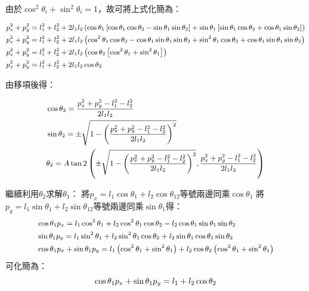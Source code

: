 \documentclass[class=NCU_thesis, crop=false]{standalone}
\begin{document}
由於$\cos^2 \theta_{i}+\sin^2 \theta_{i}=1$，故可將上式化簡為：

$$
\begin{small}
\begin{aligned}
& p_{x}^2+p_{y}^2=l_1^2+l_2^2+2l_1 l_2\left(\cos \theta_1\left[\cos \theta_1 \cos \theta_2-\sin \theta_1 \sin \theta_2\right]+\sin \theta_1\left[\sin \theta_1 \cos \theta_2+\cos \theta_1 \sin \theta_2\right]\right) \\
& p_{x}^2+p_y^2=l_1^2+l_2^2+2l_1 l_2\left(\cos^2 \theta_1 \cos \theta_2-\cos \theta_1 \sin \theta_1 \sin \theta_2+\sin^2 \theta_1 \cos \theta_2+\cos \theta_1 \sin \theta_1 \sin \theta_2\right) \\
& p_{x}^2+p_y^2=l_1^2+l_2^2+2l_1 l_2\left(\cos \theta_2\left[\cos^2 \theta_1+\sin^2 \theta_1\right]\right) \\
& p_{x}^2+p_{y}^2=l_1^2+l_2^2+2l_1 l_2 \cos \theta_2
\end{aligned}
\end{small}
$$

由移項後得：

$$
\begin{small}
\begin{aligned}
& \cos \theta_2=\frac{p_{x}^2+p_{y}^2-l_1^2-l_2^2}{2l_1 l_2} \\
& \sin \theta_2= \pm \sqrt{1-\left(\frac{p_{x}^2+p_{y}^2-l_1^2-l_2^2}{2l_1 l_2}\right)^2} \\
& \theta_2=A \tan 2\left( \pm \sqrt{1-\left(\frac{p_{x}^2+p_{y}^2-l_1^2-l_2^2}{2l_1 l_2}\right)^2}, \frac{p_{x}^2+p_{y}^2-l_1^2-l_2^2}{2l_1 l_2}\right)
\end{aligned}
\end{small}
$$

繼續利用$\theta_2$求解$\theta_1$：
將$p_{x}=l_1 \cos \theta_1+l_2 \cos \theta_{12}$等號兩邊同乘$\cos \theta_1$
將$p_{y}=l_1 \sin \theta_1+l_2 \sin \theta_{12}$等號兩邊同乘$\sin \theta_1$得：
$$
\begin{small}
\begin{aligned}
& \cos \theta_1 p_{x}=l_1 \cos^2 \theta_1+l_2 \cos^2 \theta_1 \cos \theta_2-l_2 \cos \theta_1 \sin \theta_1 \sin \theta_2 \\
& \sin \theta_1 p_{y}=l_1 \sin^2 \theta_1+l_2 \sin^2 \theta_{1} \cos \theta_2+l_2 \sin \theta_1 \cos \theta_1 \sin \theta_2 \\
& \cos \theta_1 p_{x}+\sin \theta_1 p_{y}=l_1\left(\cos^2 \theta_1+\sin^2 \theta_1\right)+l_2 \cos \theta_2\left(\cos^2 \theta_1+\sin^2 \theta_1\right)
\end{aligned}
\end{small}
$$
可化簡為：
$$
\begin{small}
\cos \theta_1 p_{x}+\sin \theta_1 p_{y}=l_1+l_2 \cos \theta_2
\end{small}
$$
\end{document}

